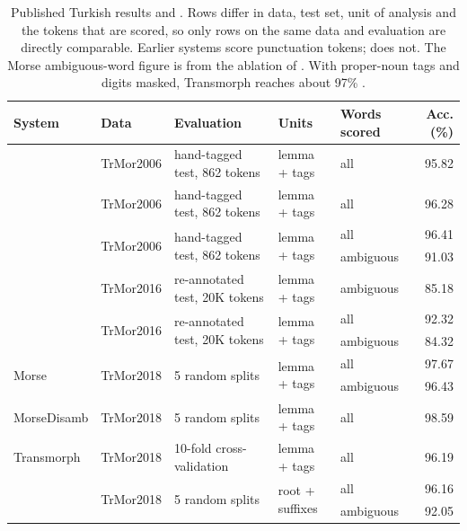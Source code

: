 \begin{table}[t]
\centering
\footnotesize
\begin{tabular}{@{}lllllr@{}}
\toprule
System & Data & Evaluation & Units & Words scored & Acc. (\%) \\
\midrule
\citet{yuret-ture-2006-learning} & TrMor2006 & hand-tagged test, 862 tokens & lemma + tags & all & 95.82 \\
\citet{sak-etal-2007-morphological} & TrMor2006 & hand-tagged test, 862 tokens & lemma + tags & all & 96.28 \\
\multirow{2}{*}{\citet{shen-etal-2016-role}} & \multirow{2}{*}{TrMor2006} & \multirow{2}{*}{hand-tagged test, 862 tokens} & \multirow{2}{*}{lemma + tags} & all & 96.41 \\
 & & & & ambiguous & 91.03 \\
\citet{yildiz-etal-2016-morphology} & TrMor2016 & re-annotated test, 20K tokens & lemma + tags & ambiguous & 85.18 \\
\multirow{2}{*}{\citet{toleu-etal-2017-character}} & \multirow{2}{*}{TrMor2016} & \multirow{2}{*}{re-annotated test, 20K tokens} & \multirow{2}{*}{lemma + tags} & all & 92.32 \\
 & & & & ambiguous & 84.32 \\
\midrule
\multirow{2}{*}{Morse \citep{akyurek-etal-2019-morphological}} & \multirow{2}{*}{TrMor2018} & \multirow{2}{*}{5 random splits} & \multirow{2}{*}{lemma + tags} & all & 97.67 \\
 & & & & ambiguous & 96.43 \\
MorseDisamb \citep{akyurek-etal-2019-morphological} & TrMor2018 & 5 random splits & lemma + tags & all & 98.59 \\
Transmorph \citep{ozer-korkmaz-2022-transmorph} & TrMor2018 & 10-fold cross-validation & lemma + tags & all & 96.19 \\
\midrule
\multirow{2}{*}{\savyar{}} & \multirow{2}{*}{TrMor2018} & \multirow{2}{*}{5 random splits} & \multirow{2}{*}{root + suffixes} & all & 96.16 \\
 & & & & ambiguous & 92.05 \\
\bottomrule
\end{tabular}
\caption{Published Turkish results and \savyar{}. Rows differ in data, test set, unit of analysis and the tokens that are scored, so only rows on the same data and evaluation are directly comparable. Earlier systems score punctuation tokens; \savyar{} does not. The Morse ambiguous-word figure is from the ablation of \citet{akyurek-etal-2019-morphological}. With proper-noun tags and digits masked, Transmorph reaches about 97\% \citep{ozer-korkmaz-2022-transmorph}.}
\label{tab:comparison}
\end{table}

